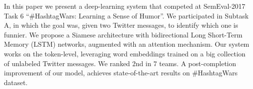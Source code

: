 In this paper we present a deep-learning system that competed at SemEval-2017 Task 6 ``\#HashtagWars: Learning a Sense of Humor''. We participated in Subtask A, in which the goal was, given two Twitter messages, to identify which one is funnier. We propose a Siamese architecture with bidirectional Long Short-Term Memory (LSTM) networks, augmented with an attention mechanism. Our system works on the token-level, leveraging word embeddings trained on a big collection of unlabeled Twitter messages. We ranked 2nd in 7 teams. A post-completion improvement of our model, achieves state-of-the-art results on \#HashtagWars dataset.
